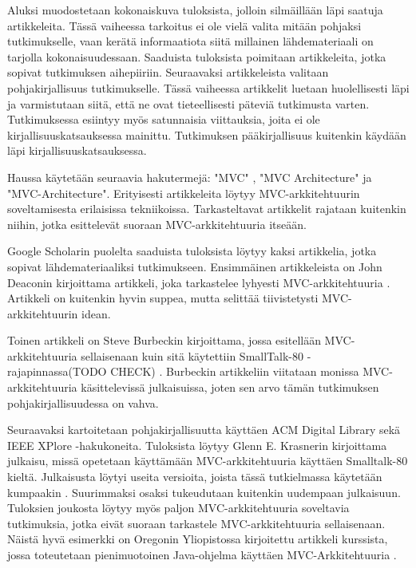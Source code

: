 \documentclass[finnish,utf8,nonumbib,palatino,kandi]{gradu2}
\begin{document}
Aluksi muodostetaan kokonaiskuva tuloksista, jolloin silmäillään läpi saatuja artikkeleita. Tässä 
vaiheessa tarkoitus ei ole vielä valita mitään pohjaksi tutkimukselle, vaan kerätä informaatiota
siitä millainen lähdemateriaali on tarjolla kokonaisuudessaan. Saaduista tuloksista poimitaan artikkeleita,
jotka sopivat tutkimuksen aihepiiriin. Seuraavaksi artikkeleista valitaan pohjakirjallisuus tutkimukselle. Tässä vaiheessa artikkelit luetaan huolellisesti
läpi ja varmistutaan siitä, että ne ovat tieteellisesti päteviä tutkimusta varten. Tutkimuksessa esiintyy myös
satunnaisia viittauksia, joita ei ole kirjallisuuskatsauksessa mainittu. Tutkimuksen pääkirjallisuus kuitenkin käydään läpi kirjallisuuskatsauksessa.

Haussa käytetään seuraavia hakutermejä: "MVC" , "MVC Architecture" ja "MVC-Architecture".  Erityisesti
artikkeleita löytyy MVC-arkkitehtuurin soveltamisesta erilaisissa tekniikoissa. Tarkasteltavat artikkelit rajataan kuitenkin niihin, jotka esittelevät suoraan MVC-arkkitehtuuria itseään.  

Google Scholarin puolelta saaduista tuloksista löytyy kaksi artikkelia, jotka sopivat
lähdemateriaaliksi tutkimukseen. Ensimmäinen artikkeleista on John Deaconin kirjoittama artikkeli, joka 
tarkastelee lyhyesti MVC-arkkitehtuuria \cite{Deacon:1995}. Artikkeli on kuitenkin hyvin suppea, mutta
selittää tiivistetysti MVC-arkkitehtuurin idean.  

Toinen artikkeli on Steve Burbeckin kirjoittama, jossa esitellään MVC-arkkitehtuuria sellaisenaan kuin 
sitä käytettiin SmallTalk-80 -rajapinnassa(TODO CHECK) \cite{Burbeck}. Burbeckin artikkeliin viitataan
monissa MVC-arkkitehtuuria käsittelevissä julkaisuissa, joten sen arvo tämän tutkimuksen pohjakirjallisuudessa on vahva. 

Seuraavaksi kartoitetaan pohjakirjallisuutta käyttäen ACM Digital Library sekä IEEE XPlore -hakukoneita. Tuloksista löytyy Glenn E.
Krasnerin kirjoittama julkaisu, missä opetetaan käyttämään MVC-arkkitehtuuria käyttäen Smalltalk-80 kieltä. Julkaisusta löytyi useita versioita, joista tässä tutkielmassa käytetään kumpaakin \cite{Krasner} \cite{Krasner:desc}.  Suurimmaksi osaksi tukeudutaan kuitenkin uudempaan julkaisuun. Tuloksien joukosta
löytyy myös paljon MVC-arkkitehtuuria soveltavia tutkimuksia, jotka eivät suoraan tarkastele MVC-arkkitehtuuria sellaisenaan. Näistä hyvä esimerkki on
Oregonin Yliopistossa kirjoitettu artikkeli kurssista, jossa toteutetaan pienimuotoinen Java-ohjelma käyttäen MVC-Arkkitehtuuria \cite{Morse}. 
\end{document}
